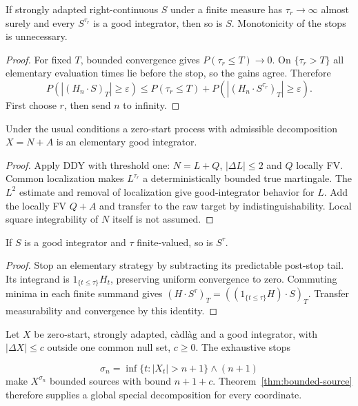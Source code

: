 \begin{lemma}
If strongly adapted right-continuous $S$ under a finite measure has
$\tau_r\to\infty$ almost surely and every $S^{\tau_r}$ is a good integrator,
then so is $S$. Monotonicity of the stops is unnecessary.
\end{lemma}
\begin{proof}
For fixed $T$, bounded convergence gives $P(\tau_r\leq T)\to0$.
On $\{\tau_r>T\}$ all elementary evaluation times lie before the stop,
so the gains agree. Therefore
\[
 P(|(H_n\cdot S)_T|\geq\varepsilon)\leq P(\tau_r\leq T)
 +P(|(H_n\cdot S^{\tau_r})_T|\geq\varepsilon).
\]
First choose $r$, then send $n$ to infinity.
\end{proof}
\begin{proposition}
Under the usual conditions a zero-start process with admissible decomposition
$X=N+A$ is an elementary good integrator.
\end{proposition}
\begin{proof}
Apply DDY with threshold one: $N=L+Q$, $|\Delta L|\leq2$ and $Q$ locally FV.
Common localization makes $L^{\tau_r}$ a deterministically bounded true
martingale. The $L^2$ estimate and removal of localization give good-integrator
behavior for $L$. Add the locally FV $Q+A$ and transfer to the raw target by
indistinguishability. Local square integrability of $N$ itself is not assumed.
\end{proof}
\begin{lemma}
If $S$ is a good integrator and $\tau$ finite-valued, so is $S^\tau$.
\end{lemma}
\begin{proof}
Stop an elementary strategy by subtracting its predictable post-stop tail.
Its integrand is $1_{\{t\leq\tau\}}H_t$, preserving uniform convergence to
zero. Commuting minima in each finite summand gives
$(H\cdot S^\tau)_T=((1_{\{t\leq\tau\}}H)\cdot S)_T$.
Transfer measurability and convergence by this identity.
\end{proof}
\begin{proposition}
Let $X$ be zero-start, strongly adapted, c\`adl\`ag and a good integrator,
with $|\Delta X|\leq c$ outside one common null set, $c\geq0$.
The exhaustive stops

\[
 \sigma_n=\inf\{t:|X_t|>n+1\}\wedge(n+1)
\]
 make $X^{\sigma_n}$ bounded
sources with bound $n+1+c$. Theorem~\ref{thm:bounded-source} therefore
supplies a global special decomposition for every coordinate.
\end{proposition}
